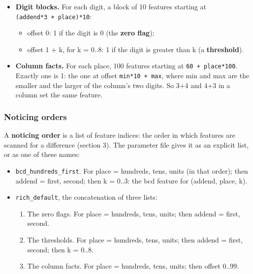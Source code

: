 \begin{itemize}
\tightlist
\item
  \textbf{Digit blocks.} For each digit, a block of 10 features starting at \texttt{(addend*3\ +\ place)*10}:

  \begin{itemize}
  \tightlist
  \item
    offset 0: 1 if the digit is 0 (the \textbf{zero flag});
  \item
    offset 1 + k, for k = 0..8: 1 if the digit is greater than k (a \textbf{threshold}).
  \end{itemize}
\item
  \textbf{Column facts.} For each place, 100 features starting at \texttt{60\ +\ place*100}. Exactly one is 1: the one at offset \texttt{min*10\ +\ max}, where min and max are the smaller and the larger of the column's two digits. So 3+4 and 4+3 in a column set the same feature.
\end{itemize}

\subsubsection{Noticing orders}\label{noticing-orders}

A \textbf{noticing order} is a list of feature indices: the order in which features are scanned for a difference (section 3). The parameter file gives it as an explicit list, or as one of these names:

\begin{itemize}
\tightlist
\item
  \texttt{bcd\_hundreds\_first}. For place = hundreds, tens, units (in that order); then addend = first, second; then k = 0..3: the bcd feature for (addend, place, k).
\item
  \texttt{rich\_default}, the concatenation of three lists:

  \begin{enumerate}
  \def\labelenumi{\arabic{enumi}.}
  \tightlist
  \item
    The zero flags. For place = hundreds, tens, units; then addend = first, second.
  \item
    The thresholds. For place = hundreds, tens, units; then addend = first, second; then k = 0..8.
  \item
    The column facts. For place = hundreds, tens, units; then offset 0..99.
  \end{enumerate}
\end{itemize}

